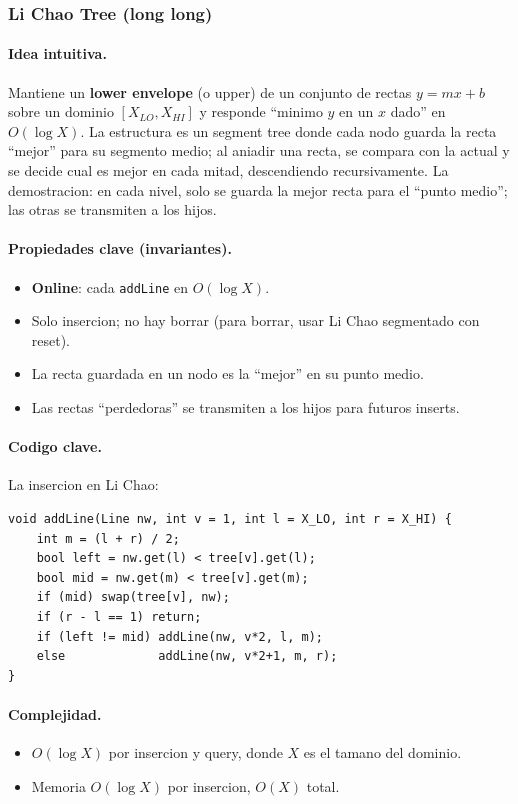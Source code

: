 ﻿\subsubsection{Li Chao Tree (long long)}

\paragraph{Idea intuitiva.}
Mantiene un \textbf{lower envelope} (o upper) de un conjunto de rectas $y = mx + b$ sobre un dominio $[X_{LO}, X_{HI}]$ y responde ``minimo $y$ en un $x$ dado'' en $O(\log X)$. La estructura es un segment tree donde cada nodo guarda la recta ``mejor'' para su segmento medio; al aniadir una recta, se compara con la actual y se decide cual es mejor en cada mitad, descendiendo recursivamente. La demostracion: en cada nivel, solo se guarda la mejor recta para el ``punto medio''; las otras se transmiten a los hijos.

\paragraph{Propiedades clave (invariantes).}
\begin{itemize}\setlength\itemsep{0pt}
	\item \textbf{Online}: cada \texttt{addLine} en $O(\log X)$.
	\item Solo insercion; no hay borrar (para borrar, usar Li Chao segmentado con reset).
	\item La recta guardada en un nodo es la ``mejor'' en su punto medio.
	\item Las rectas ``perdedoras'' se transmiten a los hijos para futuros inserts.
\end{itemize}

\paragraph{Codigo clave.}
La insercion en Li Chao:
\begin{verbatim}
void addLine(Line nw, int v = 1, int l = X_LO, int r = X_HI) {
    int m = (l + r) / 2;
    bool left = nw.get(l) < tree[v].get(l);
    bool mid = nw.get(m) < tree[v].get(m);
    if (mid) swap(tree[v], nw);
    if (r - l == 1) return;
    if (left != mid) addLine(nw, v*2, l, m);
    else             addLine(nw, v*2+1, m, r);
}
\end{verbatim}

\paragraph{Complejidad.}
\begin{itemize}\setlength\itemsep{0pt}
	\item $O(\log X)$ por insercion y query, donde $X$ es el tamano del dominio.
	\item Memoria $O(\log X)$ por insercion, $O(X)$ total.
\end{itemize}

